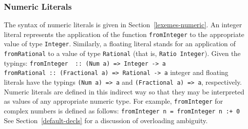 \begin{figure}
\label{basic-numeric-3}
\indextt{:+}
\end{figure}

\subsubsection{Numeric Literals}
\label{numeric-literals}

The syntax of numeric literals is given in
Section~\ref{lexemes-numeric}.  An integer literal represents the
application
of the function \mbox{\tt fromInteger} to the appropriate value of type
\mbox{\tt Integer}.  Similarly, a floating literal stands for an application of
\mbox{\tt fromRational} to a value of type \mbox{\tt Rational} (that is, 
\mbox{\tt Ratio\ Integer}).  Given the typings:
\bprog
\mbox{\tt fromInteger\ \ ::\ (Num\ a)\ =>\ Integer\ ->\ a}\\
\mbox{\tt fromRational\ ::\ (Fractional\ a)\ =>\ Rational\ ->\ a}
\eprog{}%
integer and floating literals have the
typings \mbox{\tt (Num\ a)\ =>\ a} and \mbox{\tt (Fractional\ a)\ =>\ a}, respectively.
Numeric literals are defined in this indirect way so that they may be
interpreted as values of any appropriate numeric type.
For example, \mbox{\tt fromInteger} for complex
numbers is defined as follows:
\bprog
\mbox{\tt fromInteger\ n\ =\ fromInteger\ n\ :+\ 0}
\eprog
See Section~\ref{default-decls} for a discussion of overloading ambiguity.

